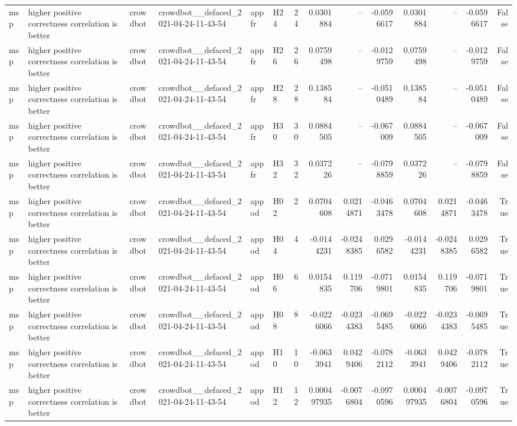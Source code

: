 \begin{longtable}{llllllrrrrrrrr}
msp & higher positive correctness correlation is better & crowdbot & crowdbot\_\_defaced\_2021-04-24-11-43-54 & appfr & H24 & 24 & 0.0301884 & -- & -0.0596617 & 0.0301884 & -- & -0.0596617 & False \\
msp & higher positive correctness correlation is better & crowdbot & crowdbot\_\_defaced\_2021-04-24-11-43-54 & appfr & H26 & 26 & 0.0759498 & -- & -0.0129759 & 0.0759498 & -- & -0.0129759 & False \\
msp & higher positive correctness correlation is better & crowdbot & crowdbot\_\_defaced\_2021-04-24-11-43-54 & appfr & H28 & 28 & 0.138584 & -- & -0.0510489 & 0.138584 & -- & -0.0510489 & False \\
msp & higher positive correctness correlation is better & crowdbot & crowdbot\_\_defaced\_2021-04-24-11-43-54 & appfr & H30 & 30 & 0.0884505 & -- & -0.067009 & 0.0884505 & -- & -0.067009 & False \\
msp & higher positive correctness correlation is better & crowdbot & crowdbot\_\_defaced\_2021-04-24-11-43-54 & appfr & H32 & 32 & 0.037226 & -- & -0.0798859 & 0.037226 & -- & -0.0798859 & False \\
msp & higher positive correctness correlation is better & crowdbot & crowdbot\_\_defaced\_2021-04-24-11-43-54 & appod & H02 & 2 & 0.0704608 & 0.0214871 & -0.0463478 & 0.0704608 & 0.0214871 & -0.0463478 & True \\
msp & higher positive correctness correlation is better & crowdbot & crowdbot\_\_defaced\_2021-04-24-11-43-54 & appod & H04 & 4 & -0.0144231 & -0.0248385 & 0.0296582 & -0.0144231 & -0.0248385 & 0.0296582 & True \\
msp & higher positive correctness correlation is better & crowdbot & crowdbot\_\_defaced\_2021-04-24-11-43-54 & appod & H06 & 6 & 0.0154835 & 0.119706 & -0.0719801 & 0.0154835 & 0.119706 & -0.0719801 & True \\
msp & higher positive correctness correlation is better & crowdbot & crowdbot\_\_defaced\_2021-04-24-11-43-54 & appod & H08 & 8 & -0.0226066 & -0.0234383 & -0.0695485 & -0.0226066 & -0.0234383 & -0.0695485 & True \\
msp & higher positive correctness correlation is better & crowdbot & crowdbot\_\_defaced\_2021-04-24-11-43-54 & appod & H10 & 10 & -0.0633941 & 0.0429406 & -0.0782112 & -0.0633941 & 0.0429406 & -0.0782112 & True \\
msp & higher positive correctness correlation is better & crowdbot & crowdbot\_\_defaced\_2021-04-24-11-43-54 & appod & H12 & 12 & 0.000497935 & -0.0076804 & -0.0970596 & 0.000497935 & -0.0076804 & -0.0970596 & True \\

\end{longtable}
